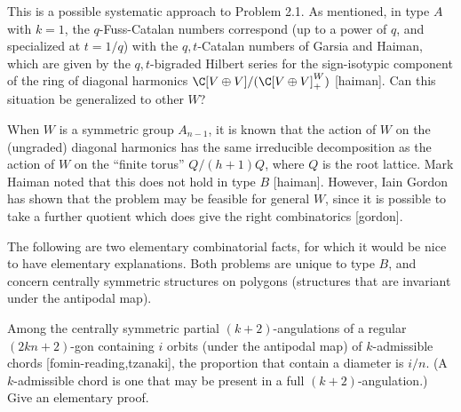 \documentclass[12pt,letterpaper, reqno]{amsart}
\begin{document}
\begin{problemblock}

\begin{problem}[2.2]
 This is a possible systematic approach to Problem 2.1. As mentioned, in type $A$ with $k=1$, the $q$-Fuss-Catalan numbers correspond (up to a power of $q$, and specialized at $t=1/q$) with the $q,t$-Catalan numbers of Garsia and Haiman, which are given by the $q,t$-bigraded Hilbert series for the sign-isotypic component of the ring of diagonal harmonics $\C[V\oplus V]/(\C[V\oplus V]_+^W)$ [haiman]. Can this situation be generalized to other $W$?
\end{problem}

\begin{distinguishedremark}
When $W$ is a symmetric group $A_{n-1}$, it is known that the action
of $W$ on the (ungraded) diagonal harmonics has the same irreducible
decomposition as the action of $W$ on the ``finite torus'' $Q/(h+1)Q$,
where $Q$ is the root lattice. Mark Haiman noted that this does not hold
in type $B$ [haiman]. However, Iain Gordon has shown that the problem
may be feasible for general $W$, since it is possible to take a further
quotient which does give the right combinatorics [gordon].
\end{distinguishedremark}

\end{problemblock}

\begin{problemblock}
 The following are two elementary combinatorial facts, for which it would be nice to have elementary explanations. Both problems are unique to type $B$, and concern centrally symmetric structures on polygons (structures that are invariant under the antipodal map).

\begin{problem}[2.3] 
Among the centrally symmetric partial $(k+2)$-angulations
of a regular $(2kn+2)$-gon containing $i$ orbits (under the antipodal
map) of $k$-admissible chords [fomin-reading,tzanaki], the proportion
that contain a diameter is $i/n$. (A $k$-admissible chord is one that
may be present in a full $(k+2)$-angulation.) Give an elementary proof.
\end{problem}
\end{problemblock}
\end{document}
